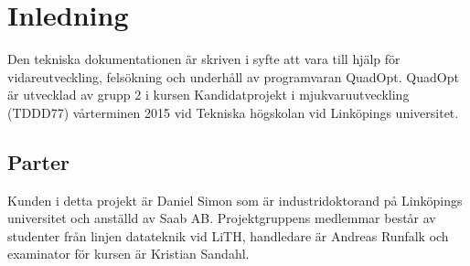 \section{Inledning}
Den tekniska dokumentationen är skriven i syfte att vara till hjälp för vidareutveckling, felsökning och underhåll av programvaran QuadOpt. QuadOpt är utvecklad av grupp 2 i kursen Kandidatprojekt i mjukvaruutveckling (TDDD77) vårterminen 2015 vid Tekniska högskolan vid Linköpings universitet.

\subsection{Parter}
Kunden i detta projekt är Daniel Simon som är industridoktorand på Linköpings universitet och anställd av Saab AB. Projektgruppens medlemmar består av studenter från linjen datateknik vid LiTH, handledare är Andreas Runfalk och examinator för kursen är Kristian Sandahl.

